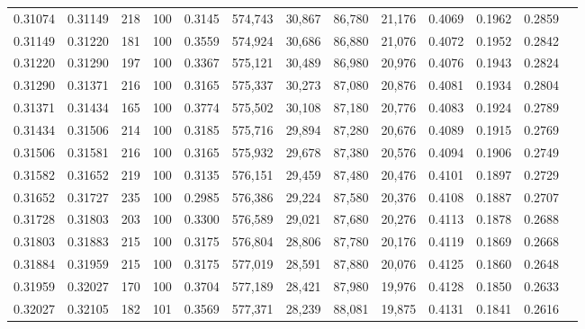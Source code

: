 \begin{tabular}{rrrrrrrrrrrrr}
0.31074 & 0.31149 &   218 & 100 &                                     0.3145 & 574,743 &  30,867 &  86,780 &  21,176 & 0.4069 & 0.1962 & 0.2859 \\
0.31149 & 0.31220 &   181 & 100 &                                     0.3559 & 574,924 &  30,686 &  86,880 &  21,076 & 0.4072 & 0.1952 & 0.2842 \\
0.31220 & 0.31290 &   197 & 100 &                                     0.3367 & 575,121 &  30,489 &  86,980 &  20,976 & 0.4076 & 0.1943 & 0.2824 \\
0.31290 & 0.31371 &   216 & 100 &                                     0.3165 & 575,337 &  30,273 &  87,080 &  20,876 & 0.4081 & 0.1934 & 0.2804 \\
0.31371 & 0.31434 &   165 & 100 &                                     0.3774 & 575,502 &  30,108 &  87,180 &  20,776 & 0.4083 & 0.1924 & 0.2789 \\
0.31434 & 0.31506 &   214 & 100 &                                     0.3185 & 575,716 &  29,894 &  87,280 &  20,676 & 0.4089 & 0.1915 & 0.2769 \\
0.31506 & 0.31581 &   216 & 100 &                                     0.3165 & 575,932 &  29,678 &  87,380 &  20,576 & 0.4094 & 0.1906 & 0.2749 \\
0.31582 & 0.31652 &   219 & 100 &                                     0.3135 & 576,151 &  29,459 &  87,480 &  20,476 & 0.4101 & 0.1897 & 0.2729 \\
0.31652 & 0.31727 &   235 & 100 &                                     0.2985 & 576,386 &  29,224 &  87,580 &  20,376 & 0.4108 & 0.1887 & 0.2707 \\
0.31728 & 0.31803 &   203 & 100 &                                     0.3300 & 576,589 &  29,021 &  87,680 &  20,276 & 0.4113 & 0.1878 & 0.2688 \\
0.31803 & 0.31883 &   215 & 100 &                                     0.3175 & 576,804 &  28,806 &  87,780 &  20,176 & 0.4119 & 0.1869 & 0.2668 \\
0.31884 & 0.31959 &   215 & 100 &                                     0.3175 & 577,019 &  28,591 &  87,880 &  20,076 & 0.4125 & 0.1860 & 0.2648 \\
0.31959 & 0.32027 &   170 & 100 &                                     0.3704 & 577,189 &  28,421 &  87,980 &  19,976 & 0.4128 & 0.1850 & 0.2633 \\
0.32027 & 0.32105 &   182 & 101 &                                     0.3569 & 577,371 &  28,239 &  88,081 &  19,875 & 0.4131 & 0.1841 & 0.2616 \\

\end{tabular}
